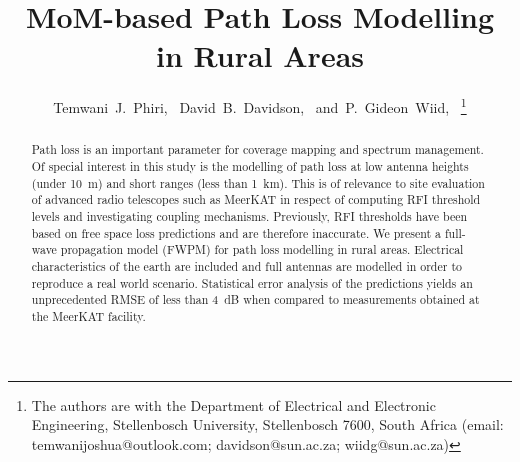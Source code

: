 \documentclass[10pt,journal,twoside]{IEEEtran}
\begin{document}
\title{MoM-based Path Loss Modelling in Rural Areas}

\author{Temwani~J.~Phiri,~
        David~B.~Davidson,~
        and~P.~Gideon~Wiid,~%
%
\thanks{The authors are with the Department of Electrical
and Electronic Engineering, Stellenbosch University, Stellenbosch 7600, South
Africa (email: temwanijoshua@outlook.com; davidson@sun.ac.za; wiidg@sun.ac.za)}}%
%
%
\maketitle
%
\begin{abstract}
Path loss is an important parameter for coverage mapping and spectrum management. Of special interest in this study is the modelling of path loss at low antenna heights (under \SI{10}{m}) and short ranges (less than \SI{1}{km}). This is of relevance to site evaluation of advanced radio telescopes such as MeerKAT in respect of computing RFI threshold levels and investigating coupling mechanisms. Previously, RFI thresholds have been based on free space loss predictions and are therefore inaccurate. We present a full-wave propagation model (FWPM) for path loss modelling in rural areas. Electrical characteristics of the earth are included and full antennas are modelled in order to reproduce a real world scenario. Statistical error analysis of the predictions yields an unprecedented RMSE of less than \SI{4}{dB} when compared to measurements obtained at the MeerKAT facility.
\end{abstract}
%
%
\end{document}
